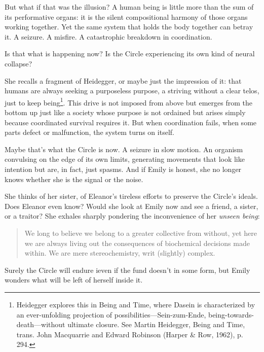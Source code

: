 But what if that was the illusion? A human being is little more than the sum of its performative organs: it is the silent compositional harmony of those organs working together. Yet the same system that holds the body together can betray it. A seizure. A misfire. A catastrophic breakdown in coordination.

Is that what is happening now? Is the Circle experiencing its own kind of neural collapse?

She recalls a fragment of Heidegger, or maybe just the impression of it: that humans are always seeking a purposeless purpose, a striving without a clear telos, just to keep being\footnote{Heidegger explores this in Being and Time, where Dasein is characterized by an ever-unfolding projection of possibilities—Sein-zum-Ende, being-towards-death—without ultimate closure. See Martin Heidegger, Being and Time, trans. John Macquarrie and Edward Robinson (Harper \& Row, 1962), p. 294.}. This drive is not imposed from above but emerges from the bottom up just like a society whose purpose is not ordained but arises simply because coordinated survival requires it. But when coordination fails, when some parts defect or malfunction, the system turns on itself.

Maybe that’s what the Circle is now. A seizure in slow motion. An organism convulsing on the edge of its own limits, generating movements that look like intention but are, in fact, just spasms. And if Emily is honest, she no longer knows whether she is the signal or the noise.

She thinks of her sister, of Eleanor’s tireless efforts to preserve the Circle’s ideals. Does Eleanor even know? Would she look at Emily now and see a friend, a sister, or a traitor? She exhales sharply pondering the inconvenience of her \textit{unseen being}:

\begin{quote} We long to believe we belong to a greater collective from without, yet here we are always living out the consequences of biochemical decisions made within. We are mere stereochemistry, writ (slightly) complex. \end{quote}

Surely the Circle will endure ieven if the fund doesn't in some form, but Emily wonders what will be left of herself inside it. 


